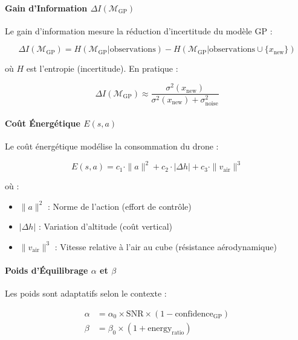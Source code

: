\documentclass[12pt,a4paper]{article}
\newcommand{\gp}{\textsc{GP}}
\begin{document}
\paragraph{Gain d'Information $\Delta I(\mathcal{M}_{\text{GP}})$}

Le gain d'information mesure la réduction d'incertitude du modèle \gp{} :

\begin{equation}
\Delta I(\mathcal{M}_{\text{GP}}) = H(\mathcal{M}_{\text{GP}} | \text{observations}) - H(\mathcal{M}_{\text{GP}} | \text{observations} \cup \{x_{\text{new}}\})
\end{equation}

où $H$ est l'entropie (incertitude). En pratique :

\begin{equation}
\Delta I(\mathcal{M}_{\text{GP}}) \approx \frac{\sigma^2(x_{\text{new}})}{\sigma^2(x_{\text{new}}) + \sigma^2_{\text{noise}}}
\end{equation}

\paragraph{Coût Énergétique $E(s, a)$}

Le coût énergétique modélise la consommation du drone :

\begin{equation}
E(s, a) = c_1 \cdot \|a\|^2 + c_2 \cdot |\Delta h| + c_3 \cdot \|v_{\text{air}}\|^3
\end{equation}

où :
\begin{itemize}
    \item $\|a\|^2$ : Norme de l'action (effort de contrôle)
    \item $|\Delta h|$ : Variation d'altitude (coût vertical)
    \item $\|v_{\text{air}}\|^3$ : Vitesse relative à l'air au cube (résistance aérodynamique)
\end{itemize}

\paragraph{Poids d'Équilibrage $\alpha$ et $\beta$}

Les poids sont adaptatifs selon le contexte :

\begin{align}
\alpha &= \alpha_0 \times \text{SNR} \times (1 - \text{confidence}_{\text{GP}}) \\
\beta &= \beta_0 \times (1 + \text{energy}_{\text{ratio}})
\end{align}
\end{document}
